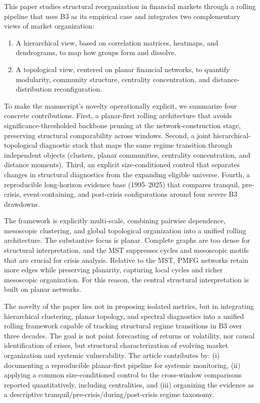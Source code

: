 \documentclass[a4paper,fleqn,review]{cas-sc}
\begin{document}
This paper studies structural reorganization in financial markets through a rolling pipeline that uses B3 as its empirical case and integrates two complementary views of market organization:
\begin{enumerate}
    \item A hierarchical view, based on correlation matrices, heatmaps, and dendrograms, to map how groups form and dissolve.
    \item A topological view, centered on planar financial networks, to quantify modularity, community structure, centrality concentration, and distance-distribution reconfiguration.
\end{enumerate}

To make the manuscript's novelty operationally explicit, we summarize four concrete contributions. First, a planar-first rolling architecture that avoids significance-thresholded backbone pruning at the network-construction stage, preserving structural comparability across windows. Second, a joint hierarchical-topological diagnostic stack that maps the same regime transition through independent objects (clusters, planar communities, centrality concentration, and distance moments). Third, an explicit size-conditioned control that separates changes in structural diagnostics from the expanding eligible universe. Fourth, a reproducible long-horizon evidence base (1995--2025) that compares tranquil, pre-crisis, event-containing, and post-crisis configurations around four severe B3 drawdowns.

The framework is explicitly multi-scale, combining pairwise dependence, mesoscopic clustering, and global topological organization into a unified rolling architecture. The substantive focus is planar. Complete graphs are too dense for structural interpretation, and the MST suppresses cycles and mesoscopic motifs that are crucial for crisis analysis. Relative to the MST, PMFG networks retain more edges while preserving planarity, capturing local cycles and richer mesoscopic organization. For this reason, the central structural interpretation is built on planar networks.

The novelty of the paper lies not in proposing isolated metrics, but in integrating hierarchical clustering, planar topology, and spectral diagnostics into a unified rolling framework capable of tracking structural regime transitions in B3 over three decades. The goal is not point forecasting of returns or volatility, nor causal identification of crises, but structural characterization of evolving market organization and systemic vulnerability. The article contributes by: (i) documenting a reproducible planar-first pipeline for systemic monitoring, (ii) applying a common size-conditioned control to the cross-window comparisons reported quantitatively, including centralities, and (iii) organizing the evidence as a descriptive tranquil/pre-crisis/during/post-crisis regime taxonomy.
\end{document}
